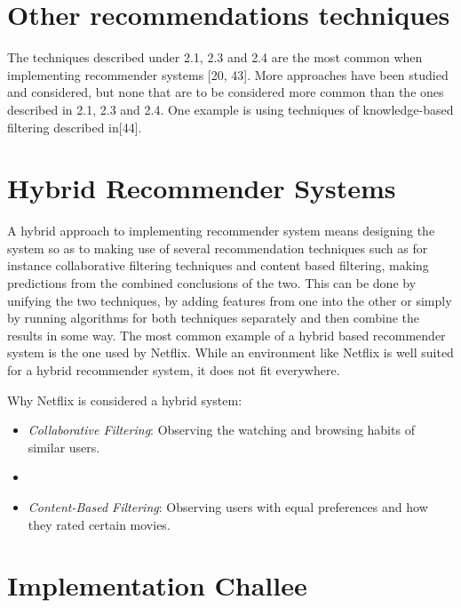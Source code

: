 \section{Other recommendations techniques}
The techniques described under 2.1, 2.3 and 2.4 are the most common when implementing recommender systems [20, 43]. More approaches have been studied and considered, but none that are to be considered more common than the ones described in 2.1, 2.3 and 2.4. One example is using techniques of knowledge-based filtering described in[44].

\section{Hybrid Recommender Systems}
A hybrid approach to implementing recommender system means designing the system so as to making use of several recommendation techniques such as for instance collaborative filtering techniques and content based filtering, making predictions from the combined conclusions of the two. This can be done by unifying the two techniques, by adding features from one into the other or simply by running algorithms for both techniques separately and then combine the results in some way. The most common example of a hybrid based recommender system is the one used by Netflix. While an environment like Netflix is well suited for a hybrid recommender system, it does not fit everywhere.

Why Netflix is considered a hybrid system:

\begin{itemize}
	\item {\textit{Collaborative Filtering}: Observing the watching and browsing habits of similar users.}
\item \blindtext
\item {\textit{Content-Based Filtering}: Observing users with equal preferences and how they rated certain movies.}

\end{itemize}

\section{Implementation Challee}






